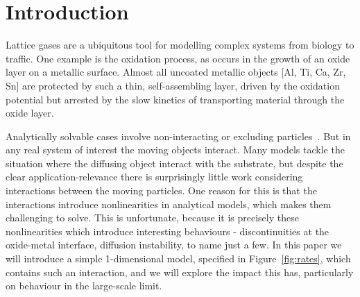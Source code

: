 \section{Introduction} \label{sec:intro}

Lattice gases are a ubiquitous tool for modelling complex systems from biology to traffic.  One example is the oxidation process, as occurs in the growth of an oxide layer on a metallic surface. Almost all uncoated metallic objects
[Al, Ti, Ca, Zr, Sn] are protected by such a thin, self-assembling layer, driven by the oxidation potential but arrested by the slow kinetics of transporting material through the oxide layer.

Analytically solvable cases involve non-interacting or excluding particles~\cite{liggett1985interacting}. But in any real system of interest the moving objects interact. Many models tackle the situation where the diffusing
object interact with the substrate,
but despite the clear application-relevance there is surprisingly little work considering interactions between the moving particles.  One reason for this is that the interactions introduce nonlinearities in analytical models, which makes them
challenging to solve. This is unfortunate, because it is precisely these nonlinearities which introduce interesting behaviours - discontinuities at the oxide-metal interface, diffusion instability, to name just a few. In this paper we will
introduce a simple 1-dimensional model, specified in Figure~\ref{fig:rates}, which contains such an interaction, and we will explore the impact this has, particularly on behaviour in the large-scale limit.

